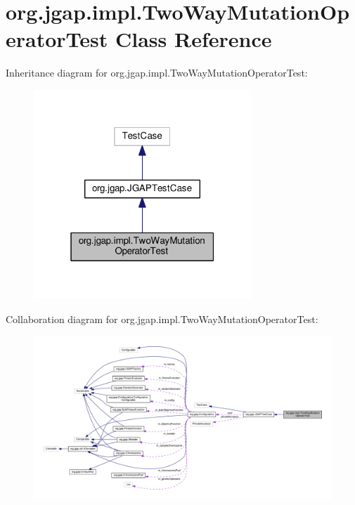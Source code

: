 \hypertarget{classorg_1_1jgap_1_1impl_1_1_two_way_mutation_operator_test}{\section{org.\-jgap.\-impl.\-Two\-Way\-Mutation\-Operator\-Test Class Reference}
\label{classorg_1_1jgap_1_1impl_1_1_two_way_mutation_operator_test}
}


Inheritance diagram for org.\-jgap.\-impl.\-Two\-Way\-Mutation\-Operator\-Test\-:
\nopagebreak
\begin{figure}[H]
\begin{center}
\leavevmode
\includegraphics[width=232pt]{classorg_1_1jgap_1_1impl_1_1_two_way_mutation_operator_test__inherit__graph}
\end{center}
\end{figure}


Collaboration diagram for org.\-jgap.\-impl.\-Two\-Way\-Mutation\-Operator\-Test\-:
\nopagebreak
\begin{figure}[H]
\begin{center}
\leavevmode
\includegraphics[width=350pt]{classorg_1_1jgap_1_1impl_1_1_two_way_mutation_operator_test__coll__graph}
\end{center}
\end{figure}
